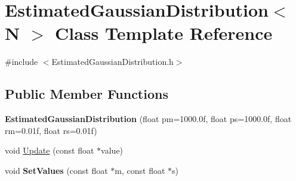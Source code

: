 \hypertarget{classEstimatedGaussianDistribution}{}\section{Estimated\+Gaussian\+Distribution$<$ N $>$ Class Template Reference}
\label{classEstimatedGaussianDistribution}


{\ttfamily \#include $<$Estimated\+Gaussian\+Distribution.\+h$>$}

\subsection*{Public Member Functions}
\begin{DoxyCompactItemize}
\item 
\hypertarget{classEstimatedGaussianDistribution_afe5b507d908e2669fe8ea708a87e7c3b}{}{\bfseries Estimated\+Gaussian\+Distribution} (float pm=1000.\+0f, float ps=1000.\+0f, float rm=0.\+01f, float rs=0.\+01f)\label{classEstimatedGaussianDistribution_afe5b507d908e2669fe8ea708a87e7c3b}

\item 
void \hyperlink{classEstimatedGaussianDistribution_a340e3a01f89d62ddab06a0dbc8e9fe3c}{Update} (const float $\ast$value)
\item 
\hypertarget{classEstimatedGaussianDistribution_a7d2ccd30d2252f59c37a810a986e78a0}{}void {\bfseries Set\+Values} (const float $\ast$m, const float $\ast$s)\label{classEstimatedGaussianDistribution_a7d2ccd30d2252f59c37a810a986e78a0}

\end{DoxyCompactItemize}
